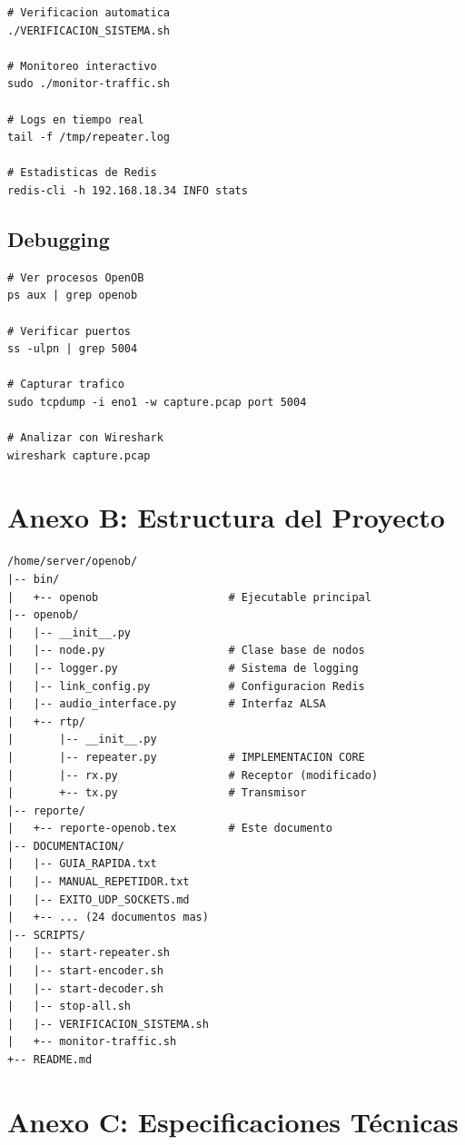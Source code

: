 \documentclass[12pt,a4paper]{article}
\begin{document}
\begin{lstlisting}[style=bashstyle]
# Verificacion automatica
./VERIFICACION_SISTEMA.sh

# Monitoreo interactivo
sudo ./monitor-traffic.sh

# Logs en tiempo real
tail -f /tmp/repeater.log

# Estadisticas de Redis
redis-cli -h 192.168.18.34 INFO stats
\end{lstlisting}

\subsection{Debugging}

\begin{lstlisting}[style=bashstyle]
# Ver procesos OpenOB
ps aux | grep openob

# Verificar puertos
ss -ulpn | grep 5004

# Capturar trafico
sudo tcpdump -i eno1 -w capture.pcap port 5004

# Analizar con Wireshark
wireshark capture.pcap
\end{lstlisting}

\section{Anexo B: Estructura del Proyecto}

\begin{verbatim}
/home/server/openob/
|-- bin/
|   +-- openob                    # Ejecutable principal
|-- openob/
|   |-- __init__.py
|   |-- node.py                   # Clase base de nodos
|   |-- logger.py                 # Sistema de logging
|   |-- link_config.py            # Configuracion Redis
|   |-- audio_interface.py        # Interfaz ALSA
|   +-- rtp/
|       |-- __init__.py
|       |-- repeater.py           # IMPLEMENTACION CORE
|       |-- rx.py                 # Receptor (modificado)
|       +-- tx.py                 # Transmisor
|-- reporte/
|   +-- reporte-openob.tex        # Este documento
|-- DOCUMENTACION/
|   |-- GUIA_RAPIDA.txt
|   |-- MANUAL_REPETIDOR.txt
|   |-- EXITO_UDP_SOCKETS.md
|   +-- ... (24 documentos mas)
|-- SCRIPTS/
|   |-- start-repeater.sh
|   |-- start-encoder.sh
|   |-- start-decoder.sh
|   |-- stop-all.sh
|   |-- VERIFICACION_SISTEMA.sh
|   +-- monitor-traffic.sh
+-- README.md
\end{verbatim}

\section{Anexo C: Especificaciones Técnicas}
\end{document}
